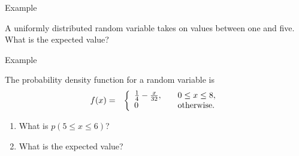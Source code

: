 \begin{frame}{Example}

  A uniformly distributed random variable takes on values between one
  and five. What is the expected value?
  
\end{frame}

\begin{frame}{Example}

  The probability density function for a random variable is 
  \begin{eqnarray*}
    f(x) & = & \left\{
      \begin{array}{l@{\hspace{2em}}l}
        \frac{1}{4}-\frac{x}{32}, & 0\leq x \leq 8, \\
        0 & \mathrm{otherwise.}
        \end{array}
      \right.
  \end{eqnarray*}
  
  \begin{enumerate}
  \item What is $p(5\leq x \leq 6)$?
  \item What is the expected value?
  \end{enumerate}
  
\end{frame}


